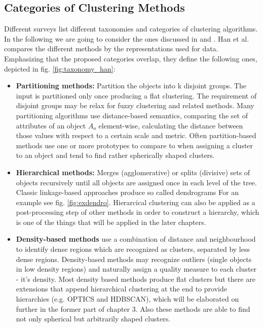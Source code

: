 \subsection{Categories of Clustering Methods}\label{\positionnumber}
Different surveys list different taxonomies and categories of clustering algorithms. In the following we are going to consider the ones discussed in \cite{han2011data} and \cite{overview_clust}.
Han et al. compares the different methods by the representations used for data. Emphasizing that the proposed categories overlap, they define the following ones, depicted in fig. \ref{fig:taxonomy_han}:
\begin{itemize}
    \item \textbf{Partitioning methods:} Partition the objects into k disjoint groups. The input is partitioned only once producing a flat clustering. The requirement of disjoint groups may be relax for fuzzy clustering and related methods. Many partitioning algorithms use distance-based semantics, comparing the set of attributes of an object $A_{o}$ element-wise, calculating the distance between those values with respect to a certain scale and metric. Often partition-based methods use one or more prototypes to compare to when assigning a cluster to an object and tend to find rather spherically shaped clusters. \\
    \item \textbf{Hierarchical methods:} Merges (agglomerative) or splits (divisive) sets of objects recursively until all objects are assigned once in each level of the tree. Classic linkage-based approaches produce so called dendrograms  For an example see fig. \ref{fig:exdendro}. Hierarcical clustering can also be applied as a post-processing step of other methods in order to construct a hierarchy, which is one of the things that will be applied in the later chapters. \\
    \item \textbf{Density-based methods} use a combination of distance and neighbourhood to identify dense regions which are recognized as clusters, separated by less dense regions. Density-based methods may recognize outliers (single objects in low density regions) and naturally assign a quality measure to each cluster - it's density. Most density based methods produce flat clusters but there are extensions that append hierarchical clustering at the end to provide hierarchies (e.g. OPTICS and HDBSCAN), which will be elaborated on further in the former part of chapter 3. Also these methods are able to find not only spherical but arbitrarily shaped clusters.  \\
    

\end{itemize}

